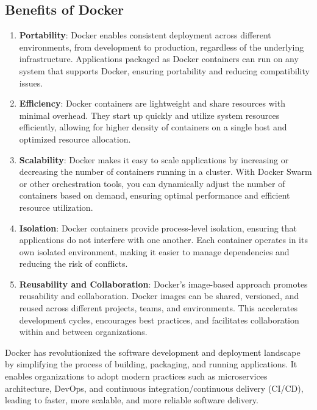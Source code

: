 \subsection*{Benefits of Docker}

\begin{enumerate}

    \item \textbf{Portability}: Docker enables consistent deployment across different environments, from development to production, regardless of the underlying infrastructure. Applications packaged as Docker containers can run on any system that supports Docker, ensuring portability and reducing compatibility issues.

    \item \textbf{Efficiency}: Docker containers are lightweight and share resources with minimal overhead. They start up quickly and utilize system resources efficiently, allowing for higher density of containers on a single host and optimized resource allocation.

    \item \textbf{Scalability}: Docker makes it easy to scale applications by increasing or decreasing the number of containers running in a cluster. With Docker Swarm or other orchestration tools, you can dynamically adjust the number of containers based on demand, ensuring optimal performance and efficient resource utilization.

    \item \textbf{Isolation}: Docker containers provide process-level isolation, ensuring that applications do not interfere with one another. Each container operates in its own isolated environment, making it easier to manage dependencies and reducing the risk of conflicts.

    \item \textbf{Reusability and Collaboration}: Docker's image-based approach promotes reusability and collaboration. Docker images can be shared, versioned, and reused across different projects, teams, and environments. This accelerates development cycles, encourages best practices, and facilitates collaboration within and between organizations.
\end{enumerate}

Docker has revolutionized the software development and deployment landscape by simplifying the process of building, packaging, and running applications. It enables organizations to adopt modern practices such as microservices architecture, DevOps, and continuous integration/continuous delivery (CI/CD), leading to faster, more scalable, and more reliable software delivery.

